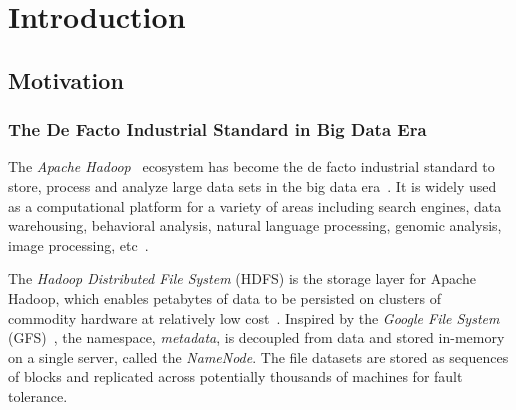 
%
%
%


\chapter{Introduction}
\label{ch:Introduction}

%




\section{Motivation}

\subsection{The De Facto Industrial Standard in Big Data Era}

The \textit{Apache Hadoop}~\cite{apachehadoop} ecosystem has become the de facto industrial standard to store, process and analyze large data sets in the big data era~\cite{cloudera}. It is widely used as a computational platform for a variety of areas including search engines, data warehousing, behavioral analysis, natural language processing, genomic analysis, image processing, etc~\cite{shvachko2011apache}. 

\noindent The \textit{Hadoop Distributed File System} (HDFS) is the storage layer for Apache Hadoop, which enables petabytes of data to be persisted on clusters of commodity hardware at relatively low cost~\cite{borthakur2008hdfs}. Inspired by the \textit{Google File System} (GFS)~\cite{ghemawat2003google}, the namespace, \textit{metadata}, is decoupled from data and stored in-memory on a single server, called the \textit{NameNode}. The file datasets are stored as sequences of blocks and replicated across potentially thousands of machines for fault tolerance.


